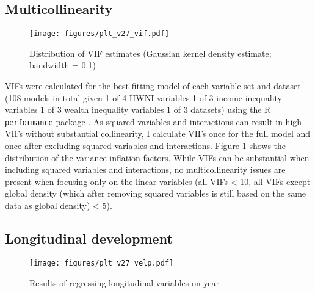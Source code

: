 \documentclass[11pt]{article}
\begin{document}
\subsection{Multicollinearity}
\label{app_vif}
\begin{figure}[htbp]
\centering
\texttt{[image: figures/plt\_v27\_vif.pdf]}
\caption{\label{fig:vif}Distribution of VIF estimates (Gaussian kernel density estimate; bandwidth = 0.1)}
\end{figure}


VIFs were calculated for the best-fitting model of each variable set and dataset (108 models in total given 1 of 4 HWNI variables \texttimes{} 1 of 3 income inequality variables \texttimes{} 1 of 3 wealth inequality variables \texttimes{} 1 of 3 datasets) using the R \texttt{performance} package \parencite{Luedecke_etal_2021_performance}. 
As squared variables and interactions can result in high VIFs without substantial collinearity, I calculate VIFs once for the full model and once after excluding squared variables and interactions.
Figure \ref{fig:vif} shows the distribution of the variance inflation factors.
While VIFs can be substantial when including squared variables and interactions, no multicollinearity issues are present when focusing only on the linear variables (all VIFs < 10, all VIFs except global density (which after removing squared variables is still based on the same data as global density) < 5).



\subsection{Longitudinal development}
\label{app_velp}
\begin{landscape}

\begin{figure}[htbp]
\centering
\texttt{[image: figures/plt\_v27\_velp.pdf]}
\caption{\label{fig:velp}Results of regressing longitudinal variables on year}
\end{figure}

\end{landscape}
\end{document}
